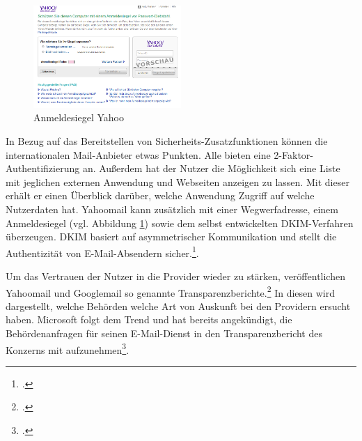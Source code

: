 \documentclass  [paper=a4,
				fontsize=12pt,
				listof=totoc,
				bibliography=totoc
				]{scrreprt}
\begin{document}
			\begin{figure} %
							\includegraphics[width=0.5\textwidth]{images/yahoo_anmeldesiegel.png}
							\caption{Anmeldesiegel Yahoo}
							\label{fig:Yahoo_Anmeldesiegel}	
						\end{figure}
			In Bezug auf das Bereitstellen von Sicherheits-Zusatzfunktionen können die internationalen Mail-Anbieter etwas Punkten. Alle bieten eine 2-Faktor- Authentifizierung an. Außerdem hat der Nutzer die Möglichkeit sich eine Liste mit jeglichen externen Anwendung und Webseiten anzeigen zu lassen. Mit dieser erhält er einen Überblick darüber, welche Anwendung Zugriff auf welche Nutzerdaten hat.
			Yahoomail kann zusätzlich mit einer Wegwerfadresse, einem Anmeldesiegel (vgl. Abbildung \ref{fig:Yahoo_Anmeldesiegel}) sowie dem selbst entwickelten \ac{DKIM}-Verfahren überzeugen. \ac{DKIM} basiert auf asymmetrischer Kommunikation und stellt die Authentizität von E-Mail-Absendern sicher.\footcite[Vgl.][]{DKIM}.
			
			
			
			\medskip
			
			Um das Vertrauen der Nutzer in die Provider wieder zu stärken, veröffentlichen Yahoomail und Googlemail  so genannte Transparenzberichte.\footcite[Vgl.][]{Lokshin} In diesen wird dargestellt, welche Behörden welche Art von Auskunft bei den Providern ersucht haben. Microsoft folgt dem Trend und hat bereits angekündigt, die Behördenanfragen für seinen E-Mail-Dienst in den Transparenzbericht des Konzerns mit aufzunehmen\footcite[Vgl.][]{Herget}.
			\medskip			
		
\end{document}
